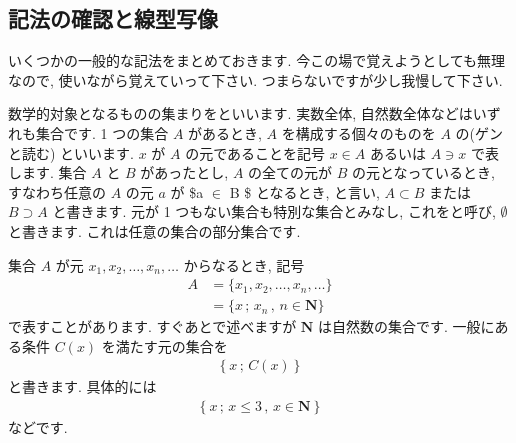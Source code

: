 \documentclass[openany, a4paper, oneside]{jsbook}
\theoremstyle{break}
\theoremstyle{breakdefn}
\begin{document}
\subsection{記法の確認と線型写像}


いくつかの一般的な記法をまとめておきます.
今この場で覚えようとしても無理なので, 使いながら覚えていって下さい.
つまらないですが少し我慢して下さい.

数学的対象となるものの集まりをといいます.
実数全体, 自然数全体などはいずれも集合です. 1 つの集合 $A$ があるとき,
 $A$ を構成する個々のものを $A$ の(ゲンと読む) といいます.
 $x$ が $A$ の元であることを記号 $x\in A$ あるいは $A\ni x$ で表します.
集合 $A$ と $B$ があったとし,  $A$ の全ての元が $B$ の元となっているとき, すなわち任意の $A$ の元 $a$ が \$a $\in$ B \$ となるとき,
と言い,  $A \subset B$ または $B\supset A$ と書きます.
元が 1 つもない集合も特別な集合とみなし, これをと呼び,  $\emptyset$ と書きます.
これは任意の集合の部分集合です.


集合 $A$ が元 $x_{1},x_{2},\dots,x_{n},\dots$ からなるとき, 記号
    \begin{align}
        A &= \{ x_{1},x_{2},\dots,x_{n},\dots \}  \\
        &= \{ x \, ; \, x_{n}\, , \, n\in \bm{N} \}
    \end{align}
で表すことがあります. すぐあとで述べますが $\bm{N}$ は自然数の集合です.
一般にある条件 $C (x)$ を満たす元の集合を
    \begin{align}
        \left \{ x \, ; \, C (x) \right \}
    \end{align}
と書きます. 具体的には
    \begin{align}
        \left \{ x \, ; \, x \leq 3\, , \, x \in \bm{N} \right \}
    \end{align}
などです.
\end{document}
